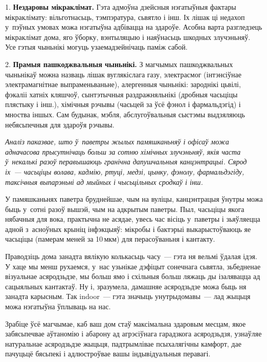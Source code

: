 1. \textbf{Нездаровы мікраклімат.} Гэта адмоўна дзейсныя нэгатыўныя фактары мікраклімату: вільготнасьць, тэмпэратура, сьвятло і інш. Іх лішак ці недахоп у~пэўных умовах можа нэгатыўна адбівацца на здароўе. Асобна варта разгледзець мікраклімат дома, яго ўборку, вэнтыляцыю і наяўнасьць шкодных злучэньняў. Усе гэтыя чыньнікі могуць узаемадзейнічаць паміж сабой.

2. \textbf{Прамыя пашкоджвальныя чыньнікі.} З магчымых пашкоджвальных чыньнікаў можна назваць лішак вуглякіслага газу, электрасмог (інтэнсіўнае электрамагнітнае выпраменьваньне), алергенныя чыньнікі: зароднікі цьвілі, фэкаліі хатніх кляшчоў, сынтэтычныя раздражняльнікі (дробныя часьціцы плястыку і інш.), хімічныя рэчывы (часьцей за ўсё фэнол і фармальдэгід) і мноства іншых. Сам будынак, мэбля, абслугоўвальныя сыстэмы выдзяляюць небясьпечныя для здароўя рэчывы.

\emph{Аналіз паказвае, што ў~паветры жылых памяшканьняў і офісаў можа адначасова прысутнічаць больш за сотню хімічных злучэньняў, якія часта ў~некалькі разоў перавышаюць гранічна дапушчальныя канцэнтрацыі. Сярод іх~--- часьціцы волава, кадмію, ртуці, медзі, цынку, фэнолу, фармальдэгіду, таксічныя выпарэньні ад мыйных і чысьцільных сродкаў і інш.}

У памяшканьнях паветра бруднейшае, чым на вуліцы, канцэнтрацыя ўнутры можа быць у~сотні разоў вышэй, чым на адкрытым паветры. Пыл, часьціцы якога нябачныя для вока, практычна не асядае, увесь час вісіць у~паветры і зьяўляецца адной з~асноўных крыніц інфэкцыяў: мікробы і бактэрыі выкарыстоўваюць яе часьціцы (памерам меней за 10\,мкм) для перасоўваньня і кантакту.


Праводзіць дома занадта вялікую колькасьць часу~--- гэта ня вельмі ўдалая ідэя. У хаце мы менш рухаемся, у~нас узьнікае дэфіцыт сонечнага сьвятла, зьбедненае візуальнае асяродзьдзе, мы больш ямо і схільныя больш ляжаць ды ізалявацца ад сацыяльных кантактаў. Ну і, зразумела, дамашняе асяродзьдзе можа быць ня занадта карысным. Так indoor~--- гэта значыць унутрыдомавы~--- лад жыцьця можа нэгатыўна ўплываць на нас.

Зрабіце ўсё магчымае, каб ваш дом стаў максімальна здаровым месцам, якое забясьпечвае аўтаномію і абарону ад агрэсіўнага гарадзкога асяродзьдзя, узнаўляе натуральнае асяродзьдзе жыцьця, падтрымлівае псыхалягічны камфорт, дае пачуцьцё бясьпекі і адлюстроўвае вашы індывідуальныя перавагі.

